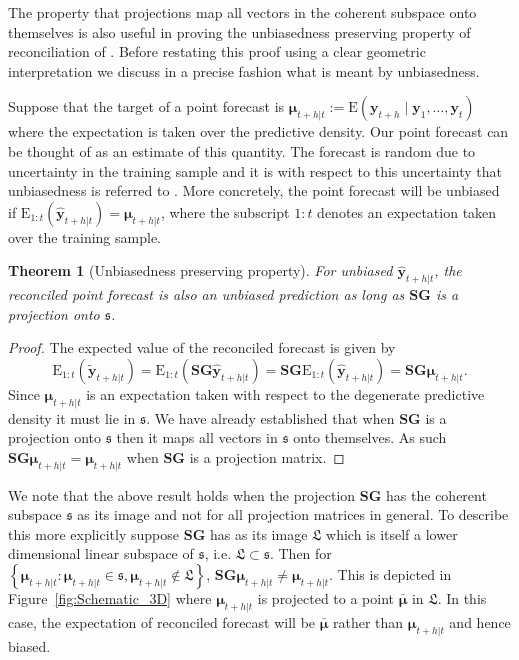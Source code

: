 \documentclass[12pt]{article}
\def\E{\text{E}}
\newtheorem{theo}{Theorem}[section]
\theoremstyle{definition}
\theoremstyle{property}
\begin{document}
	The property that projections map all vectors in the coherent subspace onto themselves is also useful in proving the unbiasedness preserving property of reconciliation of \cite{WicEtAl2019}.  Before restating this proof using a  clear geometric interpretation we discuss in a precise fashion what is meant by unbiasedness.
	
	Suppose that the target of a point forecast is $\bm{\mu}_{t+h|t}:=\E(\bm{y}_{t+h}\mid\bm{y}_{1},\dots,\bm{y}_{t})$ where the expectation is taken over the predictive density.  Our point forecast can be thought of as an estimate of this quantity. The forecast is random due to uncertainty in the training sample and it is with respect to this uncertainty that unbiasedness is referred to .  More concretely, the point forecast will be unbiased if $\E_{1:t}(\hat{\bm{y}}_{t+h|t})=\bm{\mu}_{t+h|t}$, where the subscript $1:t$ denotes an expectation taken over the training sample.
	
	\begin{theo}[Unbiasedness preserving property]
		For unbiased $\hat{\bm{y}}_{t+h|t}$, the reconciled point forecast is also an unbiased prediction as long as $\bm{SG}$ is a projection onto $\mathfrak{s}$.
	\end{theo}
	\begin{proof}
		The expected value of the reconciled forecast is given by
		\[
		\E_{1:t}(\tilde{\bm{y}}_{t+h|t})
		= \E_{1:t}(\bm{S}\bm{G}\hat{\bm{y}}_{t+h|t})
		= \bm{S}\bm{G}\E_{1:t}(\hat{\bm{y}}_{t+h|t})
		= \bm{S}\bm{G}\bm{\mu}_{t+h|t}.
		\]
		Since $\bm{\mu}_{t+h|t}$ is an expectation taken with respect to the degenerate predictive density it must lie in $\mathfrak{s}$. We have already established that when $\bm{S}\bm{G}$ is a projection onto $\mathfrak{s}$ then it maps all vectors in $\mathfrak{s}$ onto themselves. As such $\bm{S}\bm{G}\bm{\mu}_{t+h|t}=\bm{\mu}_{t+h|t}$ when $\bm{S}\bm{G}$ is a projection matrix.
	\end{proof}

	We note that the above result holds when the projection $\bm{SG}$ has the coherent subspace $\mathfrak{s}$ as its image and not for all projection matrices in general. To describe this more explicitly suppose $\bm{SG}$ has as its image  $\mathfrak{L}$ which is itself a lower dimensional linear subspace of $\mathfrak{s}$, i.e. $\mathfrak{L}\subset\mathfrak{s}$. Then for $\left\{\bm{\mu}_{t+h|t}:\bm{\mu}_{t+h|t}\in\mathfrak{s},\bm{\mu}_{t+h|t}\notin\mathfrak{L}\right\}$,  $\bm{S}\bm{G}\bm{\mu}_{t+h|t} \ne \bm{\mu}_{t+h|t}$. This is depicted in Figure~\ref{fig:Schematic_3D} where $\bm{\mu}_{t+h|t}$ is projected to a point $\bar{\bm{\mu}}$ in $\mathfrak{L}$.  In this case, the expectation of reconciled forecast will be $\bar{\bm{\mu}}$ rather than $\bm{\mu}_{t+h|t}$ and hence biased.
	
\end{document}
